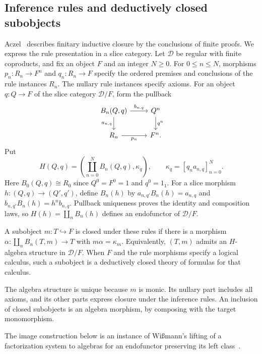 \subsection{Inference rules and deductively closed subobjects}
\label{app:closed-subobjects}

Aczel~\cite[Propositions 1.1.4 and 1.4.5]{Aczel} describes finitary
inductive closure by the conclusions of finite proofs. We express the
rule presentation in a slice category.
Let $\mathcal D$ be regular with finite coproducts, and fix an object
$F$ and an integer $N\geq0$. For $0\leq n\leq N$, morphisms
$p_n:R_n\to F^n$ and $q_n:R_n\to F$ specify the ordered premises
and conclusions of the rule instances $R_n$.
The nullary rule instances specify axioms.
For an object $q:Q\to F$ of the slice category $\mathcal D/F$,
form the pullback
\[
\begin{tikzcd}
 B_n(Q,q)\arrow[r,"{b_{n,q}}"]\arrow[d,"{a_{n,q}}"'] &
 Q^n\arrow[d,"q^n"]\\
 R_n\arrow[r,"p_n"'] & F^n.
\end{tikzcd}
\]
Put
\[
 H(Q,q)=\left(\coprod_{n=0}^N B_n(Q,q),\kappa_q\right),\qquad
 \kappa_q=[q_na_{n,q}]_{n=0}^N.
\]
Here $B_0(Q,q)\cong R_0$ since $Q^0=F^0=1$ and $q^0=1_1$.
For a slice morphism $h:(Q,q)\to(Q',q')$, define $B_n(h)$ by
$a_{n,q'}B_n(h)=a_{n,q}$ and
$b_{n,q'}B_n(h)=h^n b_{n,q}$.
Pullback uniqueness proves the identity and composition laws, so
$H(h)=\coprod_nB_n(h)$ defines an endofunctor of $\mathcal D/F$.

\begin{definition}\label{def:deductively-closed}
A subobject $m:T\hookrightarrow F$ is closed under these rules if
there is a morphism $\alpha:\coprod_nB_n(T,m)\to T$ with
$m\alpha=\kappa_m$. Equivalently, $(T,m)$ admits an $H$-algebra
structure in $\mathcal D/F$. When $F$ and the rule morphisms specify
a logical calculus, such a subobject is a deductively closed theory
of formulas for that calculus.
\end{definition}

The algebra structure is unique because $m$ is monic. Its nullary
part includes all axioms, and its other parts express closure under
the inference rules. An inclusion of closed subobjects is
an algebra morphism, by composing with the target monomorphism.

The image construction below is an instance of Wi\ss{}mann's lifting of a
factorization system to algebras for an endofunctor preserving its left
class~\cite[Lemma 3.6]{Wissmann}.

